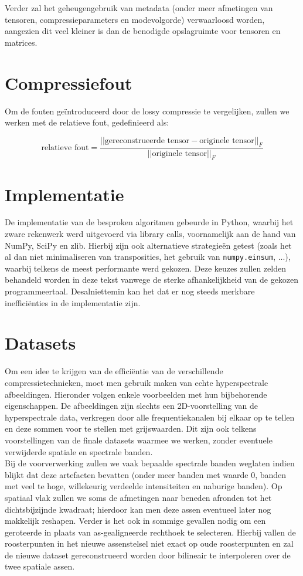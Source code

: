 Verder zal het geheugengebruik van metadata (onder meer afmetingen van tensoren, compressieparameters en modevolgorde) verwaarloosd worden, aangezien dit veel kleiner is dan de benodigde opslagruimte voor tensoren en matrices.

\section{Compressiefout}

Om de fouten ge\"introduceerd door de lossy compressie te vergelijken, zullen we werken met de relatieve fout, gedefinieerd als:

\[
\text{relatieve fout} = \frac{||\text{gereconstrueerde tensor} - \text{originele tensor}||_F}{||\text{originele tensor}||_F}
\]

\section{Implementatie}

De implementatie van de besproken algoritmen gebeurde in Python, waarbij het zware rekenwerk werd uitgevoerd via library calls, voornamelijk aan de hand van NumPy, SciPy en zlib. Hierbij zijn ook alternatieve strategie\"en getest (zoals het al dan niet minimaliseren van transposities, het gebruik van \texttt{numpy.einsum}, ...), waarbij telkens de meest performante werd gekozen. Deze keuzes zullen zelden behandeld worden in deze tekst vanwege de sterke afhankelijkheid van de gekozen programmeertaal. Desalniettemin kan het dat er nog steeds merkbare ineffici\"enties in de implementatie zijn.

\section{Datasets}

Om een idee te krijgen van de effici\"entie van de verschillende compressietechnieken, moet men gebruik maken van echte hyperspectrale afbeeldingen. Hieronder volgen enkele voorbeelden met hun bijbehorende eigenschappen. De afbeeldingen zijn slechts een 2D-voorstelling van de hyperspectrale data, verkregen door alle frequentiekanalen bij elkaar op te tellen en deze sommen voor te stellen met grijswaarden. Dit zijn ook telkens voorstellingen van de finale datasets waarmee we werken, zonder eventuele verwijderde spatiale en spectrale banden.\\

Bij de voorverwerking zullen we vaak bepaalde spectrale banden weglaten indien blijkt dat deze artefacten bevatten (onder meer banden met waarde 0, banden met veel te hoge, willekeurig verdeelde intensiteiten en naburige banden). Op spatiaal vlak zullen we soms de afmetingen naar beneden afronden tot het dichtsbijzijnde kwadraat; hierdoor kan men deze assen eventueel later nog makkelijk reshapen. Verder is het ook in sommige gevallen nodig om een geroteerde in plaats van as-gealigneerde rechthoek te selecteren. Hierbij vallen de roosterpunten in het nieuwe assenstelsel niet exact op oude roosterpunten en zal de nieuwe dataset gereconstrueerd worden door bilineair te interpoleren \cite{ref:bilinear_interpolation} over de twee spatiale assen.\\

